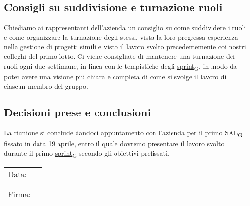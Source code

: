 \documentclass[italian,12pt]{article}
\begin{document}
\subsection{Consigli su suddivisione e turnazione ruoli}
Chiediamo ai rappresentanti dell'azienda un consiglio su come suddividere i ruoli e come 
organizzare la turnazione degli stessi, vista la loro pregressa esperienza nella gestione 
di progetti simili e visto il lavoro svolto precedentemente coi nostri colleghi del primo lotto. 
Ci viene consigliato di mantenere una turnazione dei ruoli ogni due settimane, in linea con 
le tempistiche degli \href{https://7last.github.io/docs/rtb/documentazione-interna/glossario#sprint}{sprint\textsubscript{G}}, in modo da poter avere una visione più chiara e completa di 
come si svolge il lavoro di ciascun membro del gruppo.

\subsection{Decisioni prese e conclusioni}
La riunione si conclude dandoci appuntamento con l'azienda per il primo \href{https://7last.github.io/docs/rtb/documentazione-interna/glossario#sal}{SAL\textsubscript{G}} fissato 
in data 19 aprile, entro il quale dovremo presentare il lavoro svolto durante il primo \href{https://7last.github.io/docs/rtb/documentazione-interna/glossario#sprint}{sprint\textsubscript{G}} 
secondo gli obiettivi prefissati.

\begin{table}[b]
	\begin{tabular}{@{}p{.5in}p{4in}@{}}
		Data:  & \hrulefill \\
			   &     		\\
			   &     		\\
		Firma: & \hrulefill \\
	\end{tabular}
	\end{table}
\end{document}
